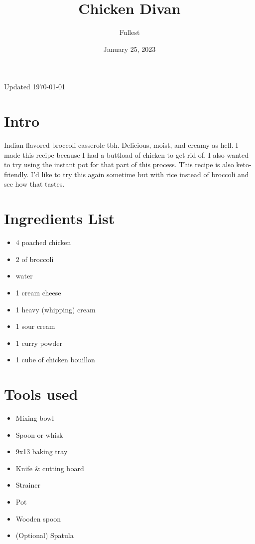 \documentclass{article}
\title{\textbf{Chicken Divan}}
\author{Fullest}
\date{January 25, 2023}
\let\US\SI
\begin{document}
\maketitle
\thispagestyle{empty}

\begin{multicols}{2}


Updated \today
\section{Intro}
\cite{WEBSITEWITHRECIPE:1}Indian flavored broccoli casserole tbh. Delicious, moist, and creamy as hell. I made this recipe because I had a buttload of chicken to get rid of. I also wanted to try using the instant pot\cite{CHICKEN} for that part of this process. This recipe is also keto-friendly. I'd like to try this again sometime but with rice instead of broccoli and see how that tastes.

\section{Ingredients List}
\begin{itemize}
	\item \US{4}{\cups} poached chicken\cite{CHICKEN}
	\item \US{2}{\florets} of broccoli
	\item water
	\item \US{1}{\cup} cream cheese
	\item \US{1}{\cup} heavy (whipping) cream
	\item \US{1}{\cup} sour cream
	\item \US{1}{\tbsp} curry powder\cite{CURRYPOWDER}
	\item 1 cube of chicken bouillon
\end{itemize}

\section{Tools used}
\begin{itemize}
	\item Mixing bowl
	\item Spoon or whisk
	\item 9x13 baking tray
	\item Knife \& cutting board
	\item Strainer
	\item Pot
	\item Wooden spoon
	\item (Optional) Spatula\\\\ %
\end{itemize}


\end{multicols}
\end{document}
